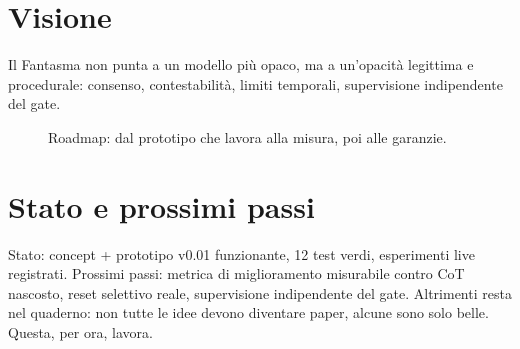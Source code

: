 \documentclass[11pt,a4paper]{article}
\begin{document}
\section{Visione}
Il Fantasma non punta a un modello pi\`u opaco, ma a un'opacit\`a legittima e procedurale:
consenso, contestabilit\`a, limiti temporali, supervisione indipendente del gate.

\begin{figure}[h]
\centering
{}
\caption{Roadmap: dal prototipo che lavora alla misura, poi alle garanzie.}
\end{figure}

\section{Stato e prossimi passi}
Stato: concept + prototipo v0.01 funzionante, 12 test verdi, esperimenti live registrati.
Prossimi passi: metrica di miglioramento misurabile contro CoT nascosto, reset selettivo
reale, supervisione indipendente del gate. Altrimenti resta nel quaderno: non tutte le
idee devono diventare paper, alcune sono solo belle. Questa, per ora, lavora.
\end{document}

